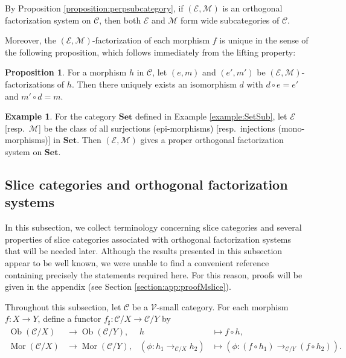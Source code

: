 \documentclass[12pt, a4paper]{amsart}
\theoremstyle{definition}
\newtheorem{proposition}[theorem]{Proposition}
\newtheorem{example}[theorem]{Example}
\newcommand{\Mor}{\mathop{\mathrm{Mor}}\nolimits}
\newcommand{\Ob}{\mathop{\mathrm{Ob}}\nolimits}
\newcommand{\Set}{{\mathbf{Set}}}
\begin{document}
By Proposition \ref{proposition:perpsubcategory}, if $(\mathcal{E},\mathcal{M})$ is an orthogonal factorization system on $\mathcal{C}$, then both $\mathcal{E}$ and $\mathcal{M}$ form wide subcategories of $\mathcal{C}$.

Moreover, the $(\mathcal{E},\mathcal{M})$-factorization of each morphism $f$ is unique in the sense of the following proposition, which follows immediately from the lifting property:

\begin{proposition}\label{proposition:uniqueness_of_factrization}
For a morphism $h$ in $\mathcal{C}$, let $(e,m)$ and $(e',m')$ be $(\mathcal{E},\mathcal{M})$-factorizations of $h$.
Then there uniquely exists an isomorphism $d$ with $d \circ e = e'$ and $m' \circ d = m$.
\end{proposition}


\begin{example}\label{Example:SetEpiMonoOFS}
For the category $\Set$ defined in Example \ref{example:SetSub}, 
let $\mathcal{E}$ [resp.~$\mathcal{M}$] be the class of all surjections (epi-morphisms) [resp.~injections (mono-morphisms)] in $\Set$.
Then $(\mathcal{E},\mathcal{M})$ gives a proper orthogonal factorization system on $\Set$.
\end{example}

\subsection{Slice categories and orthogonal factorization systems}\label{subsection:Mslice}

In this subsection, we collect terminology concerning slice categories and
several properties of slice categories associated with orthogonal
factorization systems that will be needed later.
Although the results presented in this subsection appear to be well known,
we were unable to find a convenient reference containing precisely the
statements required here. For this reason, proofs will be given in the
appendix (see Section \ref{section:app:proofMslice}).

Throughout this subsection, let $\mathcal{C}$ be a $\mathcal{V}$-small
category.
For each morphism $f:X\to Y$, define a functor
$f_\sharp:\mathcal{C}/X\to\mathcal{C}/Y$ by
\begin{align*}
\Ob(\mathcal{C}/X)
&\rightarrow
\Ob(\mathcal{C}/Y),
&
h
&\mapsto
f\circ h,
\\
\Mor(\mathcal{C}/X)
&\rightarrow
\Mor(\mathcal{C}/Y),
&
(\phi:h_1\rightarrow_{\mathcal{C}/X}h_2)
&\mapsto
(\phi:(f\circ h_1)\rightarrow_{\mathcal{C}/Y}(f\circ h_2)).
\end{align*}
\end{document}
